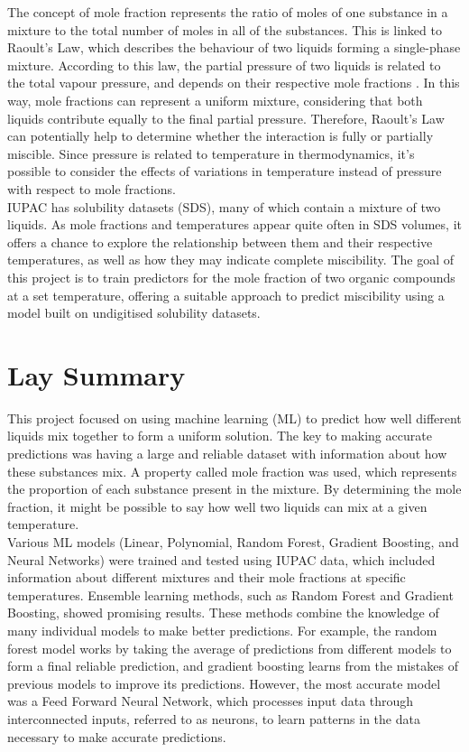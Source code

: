 \documentclass[11pt, titlepage]{article}
\begin{document}
The concept of mole fraction represents the ratio of moles of one substance in a mixture to the total number of moles in all of the substances. This is linked to Raoult's Law, which describes the behaviour of two liquids forming a single-phase mixture. According to this law, the partial pressure of two liquids is related to the total vapour pressure, and depends on their respective mole fractions \cite{1991223}. In this way, mole fractions can represent a uniform mixture, considering that both liquids contribute equally to the final partial pressure. Therefore, Raoult's Law can potentially help to determine whether the interaction is fully or partially miscible. Since pressure is related to temperature in thermodynamics, it's possible to consider the effects of variations in temperature instead of pressure with respect to mole fractions. \\

IUPAC \cite{iupac} has solubility datasets (SDS), many of which contain a mixture of two liquids. As mole fractions and temperatures appear quite often in SDS volumes, it offers a chance to explore the relationship between them and their respective temperatures, as well as how they may indicate complete miscibility. The goal of this project is to train predictors for the mole fraction of two organic compounds at a set temperature, offering a suitable approach to predict miscibility using a model built on undigitised solubility datasets. \\

\section{Lay Summary}
\label{section:Lay Summary}
This project focused on using machine learning (ML) to predict how well different liquids mix together to form a uniform solution. The key to making accurate predictions was having a large and reliable dataset with information about how these substances mix. A property called mole fraction was used, which represents the proportion of each substance present in the mixture. By determining the mole fraction, it might be possible to say how well two liquids can mix at a given temperature.\\

Various ML models (Linear, Polynomial, Random Forest, Gradient Boosting, and Neural Networks) were trained and tested using IUPAC data, which included information about different mixtures and their mole fractions at specific temperatures. Ensemble learning methods, such as Random Forest and Gradient Boosting, showed promising results. These methods combine the knowledge of many individual models to make better predictions. For example, the random forest model works by taking the average of predictions from different models to form a final reliable prediction, and gradient boosting learns from the mistakes of previous models to improve its predictions. However, the most accurate model was a Feed Forward Neural Network, which processes input data through interconnected inputs, referred to as neurons, to learn patterns in the data necessary to make accurate predictions.\\ 
\end{document}
